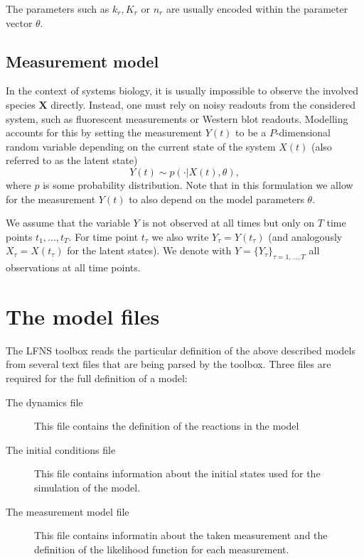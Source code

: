 \documentclass[11pt]{article} %
\begin{document}
The parameters such as $k_r, K_r$ or $n_r$ are usually encoded within the parameter vector $\theta$. 

\subsection{Measurement model}
In the context of systems biology, it is usually impossible to observe the involved species $\bm{X}$ directly. Instead, one must rely on noisy readouts from the considered system, such as fluorescent measurements or Western blot readouts. Modelling accounts for this by setting the measurement $Y(t)$ to be a $P$-dimensional random variable depending on the current state of the system $X(t)$ (also referred to as the latent state)
$$Y(t) \sim p(\cdot | X(t), \theta),$$
where $p$ is some probability distribution. Note that in this formulation we allow for the measurement $Y(t)$ to also depend on the model parameters $\theta$. 

We assume that the variable $Y$ is not observed at all times but only on $T$ time points $t_1, \ldots, t_T$. For time point $t_\tau$ we also write $Y_\tau = Y(t_\tau)$ (and analogously $X_\tau = X(t_\tau)$ for the latent states). We denote with $Y = \{Y_\tau\}_{\tau = 1, \ldots, T}$ all observations at all time points. 

\section{The model files}
The LFNS toolbox reads the particular definition of the above described models from several text files that are being parsed by the toolbox. Three files are required for the full definition of a model: 
\begin{description}
\item[The dynamics file] This file contains the definition of the reactions in the model 
\item[The initial conditions file] This file contains information about the initial states used for the simulation of the model. 
\item[The measurement model file] This file contains informatin about the taken measurement and the definition of the likelihood function for each measurement. 
\end{description}
\end{document}
